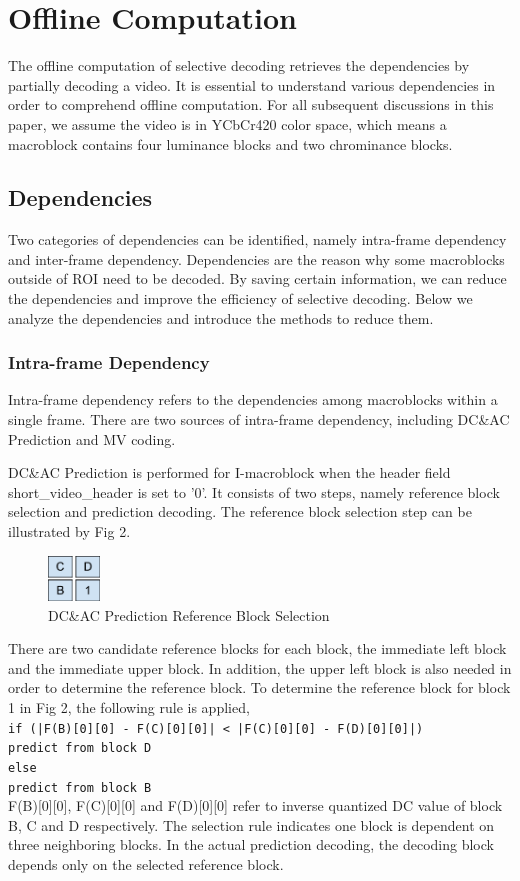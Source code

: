 \section{Offline Computation}
The offline computation of selective decoding retrieves the dependencies by partially decoding a video. It is essential to understand various dependencies in order to comprehend offline computation. For all subsequent discussions in this paper, we assume the video is in YCbCr420 color space, which means a macroblock contains four luminance blocks and two chrominance blocks.  
\subsection{Dependencies}
Two categories of dependencies can be identified, namely intra-frame dependency and inter-frame dependency. Dependencies are the reason why some macroblocks outside of ROI need to be decoded. By saving certain information, we can reduce the dependencies and improve the efficiency of selective decoding. Below we analyze the dependencies and introduce the methods to reduce them. 
\subsubsection{Intra-frame Dependency}
Intra-frame dependency refers to the dependencies among macroblocks within a single frame. There are two sources of intra-frame dependency, including DC\&AC Prediction and MV coding. 

DC\&AC Prediction is performed for I-macroblock when the header field short\_video\_header is set to '0'. It consists of two steps, namely reference block selection and prediction decoding. The reference block selection step can be illustrated by Fig 2.

\begin{figure}
\centering 
\includegraphics[height=1.2cm]{pred.eps}
\caption{DC\&AC Prediction Reference Block Selection}
\end{figure}
There are two candidate reference blocks for each block, the immediate left block and the immediate upper block. In addition, the upper left block is also needed in order to determine the reference block. To determine the reference block for block 1 in Fig 2, the following rule is applied,
{\tt \\if (|F(B)[0][0] - F(C)[0][0]| < |F(C)[0][0] - F(D)[0][0]|)\\
\indent predict from block D \\
else  \\
\indent predict from block B \\} 
F(B)[0][0], F(C)[0][0] and F(D)[0][0] refer to inverse quantized DC value of block B, C and D respectively. The selection rule indicates one block is dependent on three neighboring blocks. In the actual prediction decoding, the decoding block depends only on the selected reference block.

